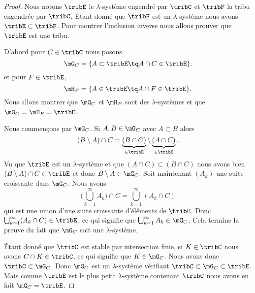 \begin{proof}
    Nous notons \( \tribE\) le \( \lambda\)-système engendré par \( \tribC\) et \( \tribF\) la tribu engendrée par \( \tribC\). Étant donné que \( \tribF\) est un \( \lambda\)-système nous avons \( \tribE\subset\tribF\). Pour montrer l'inclusion inverse nous allons prouver que \( \tribE\) est une tribu.

    D'abord pour \( C\in\tribC\) nous posons
    \begin{equation}
        \mG_C=\{ A\subset \tribE\tq A\cap C\in\tribE \}.
    \end{equation}
    et pour \( F\in\tribE\),
    \begin{equation}
        \mH_F=\{ A\in\tribE\tq A\cap F\in\tribE \}.
    \end{equation}
    Nous allons montrer que \( \mG_C\) et \( \mH_F\) sont des \( \lambda\)-systèmes et que \( \mG_C=\mH_F=\tribE\).

    Nous commençons par \( \mG_C\). Si \( A,B\in\mG_C\) avec \( A\subset B\) alors
    \begin{equation}
        (B\setminus A)\cap C=\underbrace{(B\cap C)}_{\in\tribE}\setminus\underbrace{(A\cap C)}_{\in\tribE}.
    \end{equation}
    Vu que \( \tribE\) est un \( \lambda\)-système et que \( (A\cap C)\subset(B\cap C)\) nous avons bien \( (B\setminus A)\cap C\in\tribE\) et donc \( B\setminus A\in\mG_C\). Soit maintenant \( (A_k)\) une suite croissante dans \( \mG_C\). Nous avons
    \begin{equation}
        \big( \bigcup_{k=1}^{\infty}A_k \big)\cap C=\bigcup_{k=1}^{\infty}(A_k\cap C)
    \end{equation}
    qui est une union d'une suite croissante d'éléments de \( \tribE\). Donc \( \bigcup_{k=1}^{\infty}(A_k\cap C)\in\tribE\), ce qui signifie que \( \bigcup_{k=1}^{\infty}A_k\in\mG_C\). Cela termine la preuve du fait que \( \mG_C\) soit une \( \lambda\)-système.

    Étant donné que \( \tribC\) est stable par intersection finie, si \( K\in\tribC\) nous avons \( C\cap K\in\tribC\), ce qui signifie que \( K\in\mG_C\). Nous avons donc \( \tribC\subset\mG_C\). Donc \( \mG_C\) est un \( \lambda\)-système vérifiant \( \tribC\subset\mG_C\subset\tribE\). Mais comme \( \tribE\) est le plus petit \( \lambda\)-système contenant \( \tribC\) nous avons en fait \( \mG_C=\tribE\).


\end{proof}

